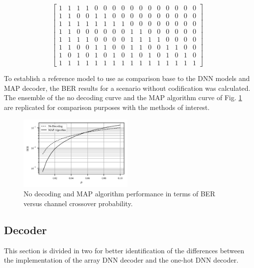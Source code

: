 \documentclass[conference]{IEEEtran}
\begin{document}
\[
\left [
  \begin{array}{cccccccccccccccc}
  
   1 & 1 & 1 & 1 & 0 & 0 & 0 & 0 & 0 & 0 & 0 & 0 & 0 & 0 & 0 & 0 \\
	1 & 1 & 0 & 0 & 1 & 1 & 0 & 0 & 0 & 0 & 0 & 0 & 0 & 0 & 0 & 0 \\
	1 & 1 & 1 & 1 & 1 & 1 & 1 & 1 & 0 & 0 & 0 & 0 & 0 & 0 & 0 & 0 \\
	1 & 1 & 0 & 0 & 0 & 0 & 0 & 0 & 1 & 1 & 0 & 0 & 0 & 0 & 0 & 0 \\
	1 & 1 & 1 & 1 & 0 & 0 & 0 & 0 & 1 & 1 & 1 & 1 & 0 & 0 & 0 & 0 \\
	1 & 1 & 0 & 0 & 1 & 1 & 0 & 0 & 1 & 1 & 0 & 0 & 1 & 1 & 0 & 0 \\
	1 & 0 & 1 & 0 & 1 & 0 & 1 & 0 & 1 & 0 & 1 & 0 & 1 & 0 & 1 & 0 \\
	1 & 1 & 1 & 1 & 1 & 1 & 1 & 1 & 1 & 1 & 1 & 1 & 1 & 1 & 1 & 1
  \end{array}
\right ]
\]

To establish a reference model to use as comparison base to the DNN models and MAP decoder, the BER results for a scenario without codification was calculated. The ensemble of the no decoding curve and the MAP algorithm curve of Fig. \ref{fig:MAP} are replicated for comparison purposes with the methods of interest.

\begin{figure}[!ht]
  \centering
    \includegraphics[width=0.5\textwidth]{images/MAP-alone-curve}
    \caption{No decoding and MAP algorithm performance in terms of BER versus channel crossover probability.}\label{fig:MAP}
\end{figure}

\subsection{Decoder}

This section is divided in two for better identification of the differences between the implementation of the array DNN decoder and the one-hot DNN decoder.
\end{document}
